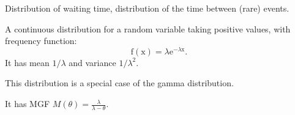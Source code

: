 
Distribution of waiting time, distribution of the time between (rare) events.  

\par
A continuous distribution for a random variable taking positive
values, with frequency function:
\[ \mathrm{f(x)} = \lambda \mathrm{e}^{- \lambda \mathrm{x}} . \]
It has mean $ 1/ \lambda $ and variance $ 1/ \lambda ^2 . $ 

\par
This distribution is a special case of the gamma distribution.
\par
It has MGF $ M ( \theta ) = \frac{\lambda}{\lambda - \theta} . $
